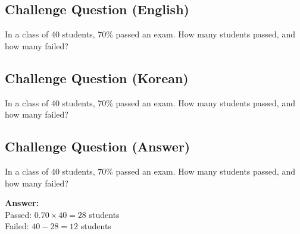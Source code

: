 \cleardoublepage
\subsection*{Challenge Question (English)}
In a class of 40 students, 70\% passed an exam. How many students passed, and how many failed?


\newpage
\subsection*{Challenge Question (Korean)}
In a class of 40 students, 70\% passed an exam. How many students passed, and how many failed?


\newpage
\subsection*{Challenge Question (Answer)}
In a class of 40 students, 70\% passed an exam. How many students passed, and how many failed?

\textbf{Answer:}\\
Passed: $0.70 \times 40 = 28$ students\\
Failed: $40 - 28 = 12$ students
